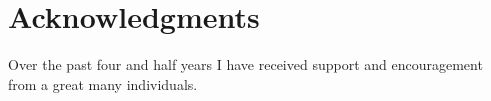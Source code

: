 \documentclass[12pt,dvips]{report}
\begin{document}



\vfill



\pagebreak


\chapter*{Acknowledgments}
Over the past four and half years I have received support and encouragement from a great many individuals.
\end{document}
